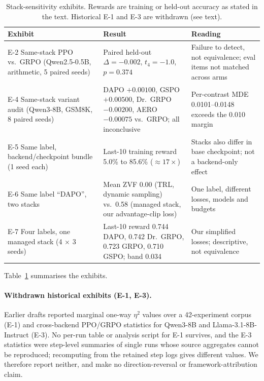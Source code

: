 \begin{table}[t]
\centering
\small
\begin{tabular}{@{}p{3.2cm}p{6.4cm}p{5.2cm}@{}}
\toprule
Exhibit & Result & Reading \\
\midrule
E-2 Same-stack PPO vs.\ GRPO (Qwen2.5-0.5B, arithmetic, 5 paired seeds) &
Paired held-out $\Delta=-0.002$, $t_4=-1.0$, $p=0.374$ &
Failure to detect, not equivalence; eval items not matched across arms \\
E-4 Same-stack variant audit (Qwen3-8B, GSM8K, 8 paired seeds) &
DAPO $+0.00100$, GSPO $+0.00500$, Dr.\ GRPO $-0.00200$, AERO $-0.00075$ vs.\ GRPO; all inconclusive &
Per-contrast MDE 0.0101--0.0148 exceeds the 0.010 margin \\
E-5 Same label, backend/checkpoint bundle (1 seed each) &
Last-10 training reward 5.0\% to 85.6\% ($\approx17\times$) &
Stacks also differ in base checkpoint; not a backend-only effect \\
E-6 Same label ``DAPO'', two stacks &
Mean ZVF 0.00 (TRL, dynamic sampling) vs.\ 0.58 (managed stack, our advantage-clip loss) &
One label, different losses, models and budgets \\
E-7 Four labels, one managed stack (4 $\times$ 3 seeds) &
Last-10 reward 0.744 DAPO, 0.742 Dr.\ GRPO, 0.723 GRPO, 0.710 GSPO; band 0.034 &
Our simplified losses; descriptive, not equivalence \\
\bottomrule
\end{tabular}
\caption{Stack-sensitivity exhibits. Rewards are training or held-out
accuracy as stated in the text. Historical E-1 and E-3 are withdrawn (see
text).}
\label{tab:exhibits}
\end{table}

Table~\ref{tab:exhibits} summarises the exhibits.

\paragraph{Withdrawn historical exhibits (E-1, E-3).}
Earlier drafts reported marginal one-way $\eta^2$ values over a 42-experiment
corpus (E-1) and cross-backend PPO/GRPO statistics for Qwen3-8B and
Llama-3.1-8B-Instruct (E-3). No per-run table or analysis script for E-1
survives, and the E-3 statistics were step-level summaries of single runs
whose source aggregates cannot be reproduced; recomputing from the retained
step logs gives different values. We therefore report neither, and make no
direction-reversal or framework-attribution claim.


